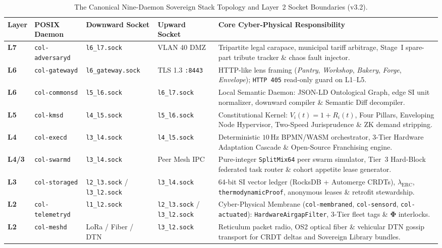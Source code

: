 \begin{table}[htbp]
\centering
\caption{The Canonical Nine-Daemon Sovereign Stack Topology and Layer~2 Socket Boundaries (v3.2).}
\label{tab:l2-nine-daemon-roster}
\footnotesize
\begin{tabular}{@{}llllp{5.5cm}@{}}
\toprule
\textbf{Layer} & \textbf{POSIX Daemon} & \textbf{Downward Socket} & \textbf{Upward Socket} & \textbf{Core Cyber-Physical Responsibility} \\
\midrule
\textbf{L7} & \texttt{col-adversaryd} & \texttt{l6\_l7.sock} & VLAN 40 DMZ & Tripartite legal carapace, municipal tariff arbitrage, Stage~I spare-part tribute tracker \& chaos fault injector. \\
\textbf{L6} & \texttt{col-gatewayd} & \texttt{l6\_gateway.sock} & TLS 1.3 \texttt{:8443} & HTTP-like lens framing (\textit{Pantry}, \textit{Workshop}, \textit{Bakery}, \textit{Forge}, \textit{Envelope}); \texttt{HTTP 405} read-only guard on L1--L5. \\
\textbf{L6} & \texttt{col-commonsd} & \texttt{l5\_l6.sock} & \texttt{l6\_l7.sock} & Local Semantic Daemon: JSON-LD Ontological Graph, edge SI unit normalizer, downward compiler \& Semantic Diff decompiler. \\
\textbf{L5} & \texttt{col-kmsd} & \texttt{l4\_l5.sock} & \texttt{l5\_l6.sock} & Constitutional Kernel: $V_i(t) = 1 + R_i(t)$, Four Pillars, Enveloping Node Hypervisor, Two-Speed Jurisprudence \& ZK demand stripping. \\
\textbf{L4} & \texttt{col-execd} & \texttt{l3\_l4.sock} & \texttt{l4\_l5.sock} & Deterministic $10\,\mathrm{Hz}$ BPMN/WASM orchestrator, 3-Tier Hardware Adaptation Cascade \& Open-Source Franchising engine. \\
\textbf{L4/3} & \texttt{col-swarmd} & \texttt{l3\_l4.sock} & Peer Mesh IPC & Pure-integer \texttt{SplitMix64} peer swarm simulator, Tier~3 Hard-Block federated task router \& cohort appetite lease generator. \\
\textbf{L3} & \texttt{col-storaged} & \texttt{l2\_l3.sock} / \texttt{l3\_l2.sock} & \texttt{l3\_l4.sock} & 64-bit SI vector ledger (RocksDB + Automerge CRDTs), $\lambda_{\mathrm{ERC}}$, \texttt{thermodynamicProof}, anonymous leases \& retrofit stewardship. \\
\textbf{L2} & \texttt{col-telemetryd} & \texttt{l1\_l2.sock} & \texttt{l2\_l3.sock} / \texttt{l3\_l2.sock} & Cyber-Physical Membrane (\texttt{col-membraned}, \texttt{col-sensord}, \texttt{col-actuated}): \texttt{HardwareAirgapFilter}, 3-Tier fleet tags \& $\mathbf{\Phi}$ interlocks. \\
\textbf{L2} & \texttt{col-meshd} & LoRa / Fiber / DTN & \texttt{l3\_l2.sock} & Reticulum packet radio, OS2 optical fiber \& vehicular DTN gossip transport for CRDT deltas and Sovereign Library bundles. \\
\bottomrule
\end{tabular}
\end{table}

